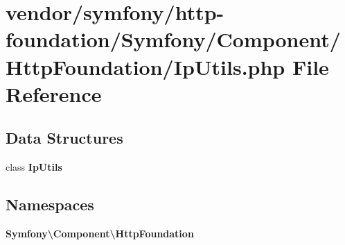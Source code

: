 \section{vendor/symfony/http-\/foundation/\+Symfony/\+Component/\+Http\+Foundation/\+Ip\+Utils.php File Reference}
\label{_ip_utils_8php}
\subsection*{Data Structures}
\begin{DoxyCompactItemize}
\item 
class {\bf Ip\+Utils}
\end{DoxyCompactItemize}
\subsection*{Namespaces}
\begin{DoxyCompactItemize}
\item 
 {\bf Symfony\textbackslash{}\+Component\textbackslash{}\+Http\+Foundation}
\end{DoxyCompactItemize}

